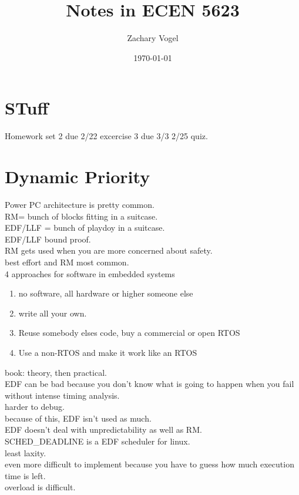 \documentclass{article}
\author{Zachary Vogel}
\date{\today}
\title{Notes in ECEN 5623}
\begin{document}
\maketitle


\section*{STuff}
Homework set 2 due 2/22
excercise 3 due 3/3
2/25 quiz.\\

\section*{Dynamic Priority}
Power PC architecture is pretty common.\\

RM= bunch of blocks fitting in a suitcase.\\
EDF/LLF = bunch of playdoy in a suitcase.\\

EDF/LLF bound proof.\\
RM gets used when you are more concerned about safety.\\

best effort and RM most common.\\

4 approaches for software in embedded systems
\begin{enumerate}
    \item no software, all hardware or higher someone else
    \item write all your own.
    \item Reuse somebody elses code, buy a commercial or open RTOS
    \item Use a non-RTOS and make it work like an RTOS
\end{enumerate}

book: theory, then practical.\\

EDF can be bad because you don't know what is going to happen when you fail without intense timing analysis.\\
harder to debug.\\
because of this, EDF isn't used as much.\\
EDF doesn't deal with unpredictability as well as RM.\\
SCHED\_DEADLINE is a EDF scheduler for linux.\\


least laxity.\\
even more difficult to implement because you have to guess how much execution time is left.\\
overload is difficult.\\
\end{document}
